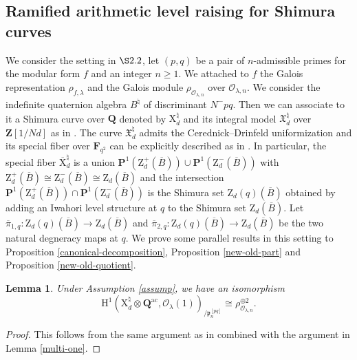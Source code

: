 \documentclass[10pt]{amsart}
\newcommand*\Z{\mathds{Z}}
\newcommand*\ZZ{|[draw,circle]| \Z_2}
\numberwithin{equation}{section}
\theoremstyle{plain}
\newtheorem{lemma}[theorem]{Lemma}
\numberwithin{equation}{section}
\theoremstyle{definition}
\theoremstyle{remark}
\def\ac{\mathrm{ac}}
\def\interX{\mathfrak{X}}
\def\ac{\mathrm{ac}}
\def\calO{\mathcal{O}}
\def\frakp{\mathfrak{p}}
\def\FF{\mathbf{F}}
\def\PP{\mathbf{P}}
\def\QQ{\mathbf{Q}}
\def\ZZ{\mathbf{Z}}
\def\rmH{\mathrm{H}}
\def\rmX{\mathrm{X}}
\def\rmZ{\mathrm{Z}}
\begin{document}
\subsection{Ramified arithmetic level raising for Shimura curves}
We consider the setting in $\S2.2$, let $(p,q)$ be a pair of $n$-admissible primes for the modular form $f$ and an integer $n\geq 1$. We attached to $f$ the Galois representation $\rho_{f,\lambda}$ and the Galois module $\rho_{\calO_{\lambda, n}}$ over $\calO_{\lambda, n}$. We consider the indefinite quaternion algebra $B^{\natural}$ of discriminant $N^{-}pq$. Then we can associate to it a Shimura curve over $\QQ$ denoted by $\rmX^{\natural}_{d}$ and its integral model $\interX^{\natural}_{d}$ over $\ZZ[1/Nd]$ as in \cite[3A]{Wang}. The curve $\interX^{\natural}_{d}$ admits the Cerednick--Drinfeld uniformization and its special fiber over $\FF_{q^{2}}$ can be explicitly described as in \cite[Proposition 2.2]{Wang}. In particular, the special fiber $\overline{\rmX}^{\natural}_{d}$ is a union $\PP^{1}(\rmZ^{+}_{d}(\overline{B}))\cup \PP^{1}(\rmZ^{-}_{d}(\overline{B}))$ with $\rmZ^{+}_{d}(\overline{B})\cong \rmZ^{-}_{d}(\overline{B})\cong\rmZ_{d}(\overline{B})$ and the intersection $\PP^{1}(\rmZ^{+}_{d}(\overline{B}))\cap \PP^{1}(\rmZ^{-}_{d}(\overline{B}))$ is the Shimura set $\rmZ_{d}(q)(\overline{B})$ obtained by adding an Iwahori level structure at $q$ to the Shimura set $\rmZ_{d}(\overline{B})$. Let $\overline{\pi}_{1,q}:\rmZ_{d}(q)(\overline{B})\rightarrow \rmZ_{d}(\overline{B})$ and $\overline{\pi}_{2,q}:\rmZ_{d}(q)(\overline{B})\rightarrow \rmZ_{d}(\overline{B})$ be the two natural degneracy maps at $q$.
We prove some parallel results in this setting to Proposition \ref{canonical-decomposition}, Proposition \ref{new-old-part} and Proposition \ref{new-old-quotient}.
\begin{lemma}\label{unramified-drinfeld}
Under Assumption \ref{assump}, we have an isomorphism 
\begin{equation*}
\rmH^{1}(\rmX^{\natural}_{d}\otimes{\QQ^{\ac}}, \calO_{\lambda}(1))_{/\frakp^{[pq]}_{n}}\cong \rho^{\oplus 2}_{\calO_{\lambda, n}}.
\end{equation*}
\end{lemma}
\begin{proof}
This follows from the same argument as in \cite[Theorem 5.17]{BD} combined with the argument in Lemma \ref{multi-one}. 
\end{proof}
\end{document}
